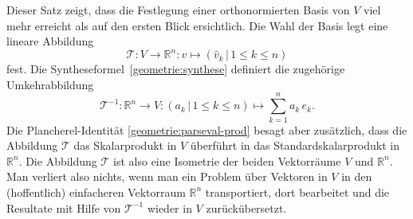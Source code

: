 Dieser Satz zeigt, dass die Festlegung einer orthonormierten Basis von $V$
viel mehr erreicht als auf den ersten Blick ersichtlich.
Die Wahl der Basis legt eine lineare Abbildung
\[
\mathcal{T}
\colon
V\to \mathbb R^n
:
v \mapsto (\hat{v}_k\,|\, 1\le k\le n)
\]
fest.
Die Syntheseformel~\eqref{geometrie:synthese} definiert die zugehörige
Umkehrabbildung
\[
\mathcal{T}^{-1}
\colon
\mathbb R^n \to V
:
(a_k\,|\,1\le k \le n)
\mapsto
\sum_{k=1}^n a_k\,e_k.
\]
Die Plancherel-Identität
\eqref{geometrie:parseval-prod} besagt aber zusätzlich, dass
die Abbildung $\mathcal{T}$ das Skalarprodukt in $V$ überführt in
das Standardskalarprodukt in $\mathbb R^n$.
Die Abbildung $\mathcal{T}$ ist also eine Isometrie der beiden Vektorräume
$V$ und $\mathbb R^n$.
Man verliert also nichts, wenn man ein Problem über Vektoren in $V$ in
den (hoffentlich) einfacheren Vektorraum $\mathbb R^n$ transportiert,
dort bearbeitet und die Resultate mit Hilfe von $\mathcal{T}^{-1}$
wieder in $V$ zurückübersetzt.



